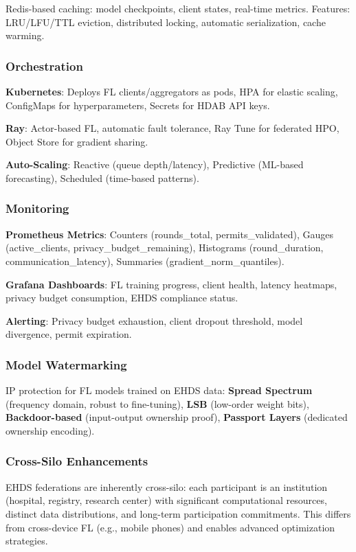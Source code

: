 \documentclass[conference]{IEEEtran}
\begin{document}
Redis-based caching: model checkpoints, client states, real-time metrics. Features: LRU/LFU/TTL eviction, distributed locking, automatic serialization, cache warming.

\subsubsection{Orchestration}

\textbf{Kubernetes}: Deploys FL clients/aggregators as pods, HPA for elastic scaling, ConfigMaps for hyperparameters, Secrets for HDAB API keys.

\textbf{Ray}: Actor-based FL, automatic fault tolerance, Ray Tune for federated HPO, Object Store for gradient sharing.

\textbf{Auto-Scaling}: Reactive (queue depth/latency), Predictive (ML-based forecasting), Scheduled (time-based patterns).

\subsubsection{Monitoring}

\textbf{Prometheus Metrics}: Counters (rounds\_total, permits\_validated), Gauges (active\_clients, privacy\_budget\_remaining), Histograms (round\_duration, communication\_latency), Summaries (gradient\_norm\_quantiles).

\textbf{Grafana Dashboards}: FL training progress, client health, latency heatmaps, privacy budget consumption, EHDS compliance status.

\textbf{Alerting}: Privacy budget exhaustion, client dropout threshold, model divergence, permit expiration.

\subsubsection{Model Watermarking}

IP protection for FL models trained on EHDS data: \textbf{Spread Spectrum} (frequency domain, robust to fine-tuning), \textbf{LSB} (low-order weight bits), \textbf{Backdoor-based} (input-output ownership proof), \textbf{Passport Layers} (dedicated ownership encoding).

\subsubsection{Cross-Silo Enhancements}

EHDS federations are inherently cross-silo: each participant is an institution (hospital, registry, research center) with significant computational resources, distinct data distributions, and long-term participation commitments. This differs from cross-device FL (e.g., mobile phones) and enables advanced optimization strategies.
\end{document}
